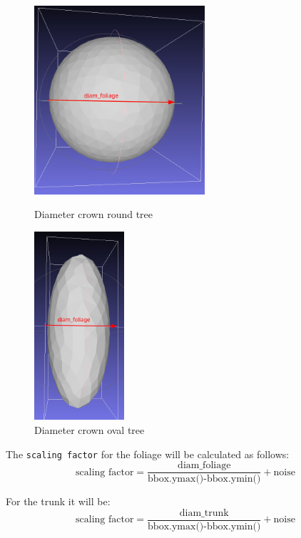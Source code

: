 \documentclass[12pt]{article}
\begin{document}
\begin{figure}[H]
    \centering
    \begin{minipage}{0.45\textwidth}
        \centering
        \includegraphics[height=7cm]{images/diam_foliage_round.png}
        \caption{Diameter crown round tree}
    \end{minipage}
    \begin{minipage}{0.45\textwidth}
        \centering
        \includegraphics[height=7cm]{images/diam_foliage_oval.png}
        \caption{Diameter crown oval tree}
    \end{minipage}
\end{figure}

The \texttt{scaling factor} for the foliage will be calculated as follows:
\begin{equation}
    \text{scaling factor} = \frac{\text{diam\_foliage}}{\text{bbox.ymax()-bbox.ymin()}} + \text{noise}
\end{equation}

For the trunk it will be:
\begin{equation}
    \text{scaling factor} = \frac{\text{diam\_trunk}}{\text{bbox.ymax()-bbox.ymin()}} + \text{noise}  
\end{equation}
\end{document}
